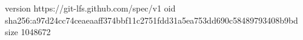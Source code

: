version https://git-lfs.github.com/spec/v1
oid sha256:a97d24cc74ceaeaaff374bbf11c2751fdd31a5ea753dd690c58489793408b9bd
size 1048672
